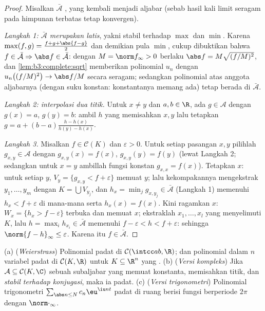 \begin{proof}
Misalkan $\bar{\mathcal A}$ , yang kembali menjadi aljabar
(sebab hasil kali limit seragam pada himpunan terbatas tetap konvergen).

\emph{Langkah 1: $\bar{\mathcal A}$ merupakan latis}, yakni stabil
terhadap $\max$ dan $\min$. Karena $\max(f,g) = \frac{f + g +
\abs{f-g}}2$ dan demikian pula $\min$, cukup dibuktikan bahwa $f \in
\bar{\mathcal A} \Rightarrow \abs f \in \bar{\mathcal A}$: dengan
$M = \norm f_\infty > 0$ berlaku $\abs f = M\sqrt{(f/M)^2}$, dan
\cref{lem:b3:complete:sqrt} memberikan polinomial $u_n$ dengan
$u_n\bigl((f/M)^2\bigr) \to \abs f/M$ secara seragam; sedangkan polinomial atas
anggota aljabarnya (dengan suku konstan: konstantanya memang
ada) tetap berada di $\bar{\mathcal A}$.

\emph{Langkah 2: interpolasi dua titik.} Untuk $x \neq y$ dan $a,
b \in \R$, ada $g \in \mathcal A$ dengan $g(x) = a$, $g(y) = b$:
ambil $h$ yang memisahkan $x, y$ lalu tetapkan $g = a + (b -
a)\frac{h - h(x)}{h(y) - h(x)}$.

\emph{Langkah 3.} Misalkan $f \in \mathcal C(K)$ dan $\varepsilon > 0$.
Untuk setiap pasangan $x, y$ pilihlah $g_{x,y} \in \mathcal A$ dengan
$g_{x,y}(x) = f(x)$, $g_{x,y}(y) = f(y)$ (lewat Langkah 2; sedangkan untuk $x = y$
ambillah fungsi konstan $g_{x,x} = f(x)$).
Tetapkan $x$: untuk setiap $y$,  $V_y = \{g_{x,y} < f +
\varepsilon\}$ memuat $y$; lalu kekompakannya mengekstrak $y_1, \dots,
y_m$ dengan $K = \bigcup V_{y_j}$, dan $h_x = \min_j g_{x, y_j}
\in \bar{\mathcal A}$ (Langkah 1) memenuhi $h_x < f +
\varepsilon$ di mana-mana serta $h_x(x) = f(x)$. Kini ragamkan $x$: $W_x =
\{h_x > f - \varepsilon\}$ terbuka dan memuat $x$; ekstraklah $x_1,
\dots, x_l$ yang menyelimuti $K$, lalu $h = \max_i h_{x_i} \in
\bar{\mathcal A}$ memenuhi $f - \varepsilon < h < f +
\varepsilon$: sehingga $\norm{f - h}_\infty \leq \varepsilon$. Karena itu
$f \in \bar{\mathcal A}$.
\end{proof}

\begin{corollary}\label{cor:b3:complete:weierstrass}
(a) (\emph{Weierstrass}) Polinomial padat di $\mathcal
C(\intcc ab, \R)$; dan polinomial dalam $n$ variabel padat di
$\mathcal C(K, \R)$ untuk $K \subseteq \R^n$ yang .
(b) (\emph{Versi kompleks}) Jika $\mathcal A \subseteq \mathcal
C(K, \C)$ sebuah subaljabar yang memuat konstanta, memisahkan
titik, dan \emph{stabil terhadap konjugasi}, maka ia padat.
(c) (\emph{Versi trigonometri}) Polinomial trigonometri
$\sum_{\abs n \leq N}c_n\eu^{\iu n t}$ padat di ruang berisi
fungsi  berperiode $2\pi$ dengan
$\norm\cdot_\infty$.
\end{corollary}

